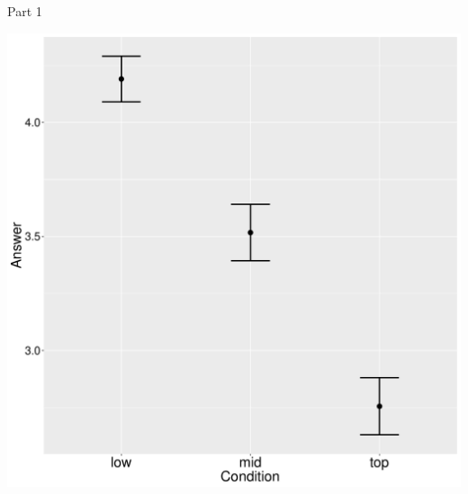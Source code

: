 \documentclass[ignorenonframetext,]{beamer}
\begin{document}
\begin{frame}{Part 1}

\begin{center}
\includegraphics[scale=0.23]{exp1-ani-part_1-errorbars.pdf}
\end{center}

\end{frame}
\end{document}
